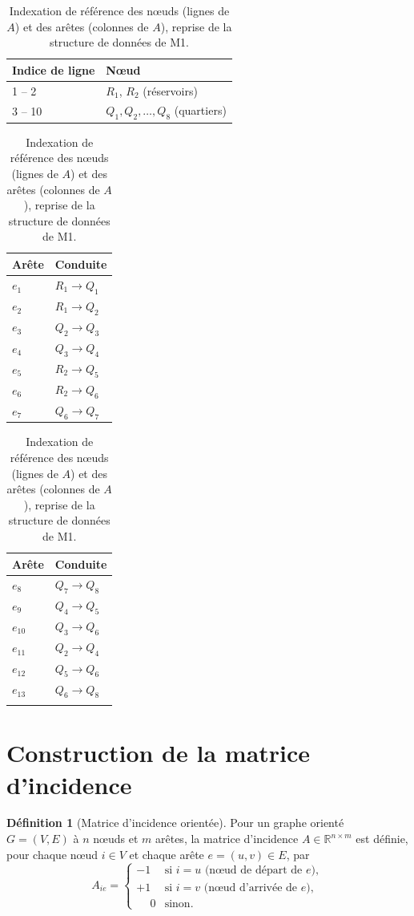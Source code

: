 \documentclass[11pt,a4paper]{article}
\theoremstyle{plain}
\theoremstyle{definition}
\newtheorem{definition}{Définition}
\theoremstyle{remark}
\begin{document}
\begin{table}[h]
\centering
\begin{tabular}{@{}ll@{}}
\toprule
Indice de ligne & Nœud \\
\midrule
1 -- 2 & $R_1$, $R_2$ (réservoirs) \\
3 -- 10 & $Q_1, Q_2, \dots, Q_8$ (quartiers) \\
\bottomrule
\end{tabular}
\qquad
\begin{tabular}{@{}ll@{}}
\toprule
Arête & Conduite \\
\midrule
$e_1$ & $R_1 \to Q_1$ \\
$e_2$ & $R_1 \to Q_2$ \\
$e_3$ & $Q_2 \to Q_3$ \\
$e_4$ & $Q_3 \to Q_4$ \\
$e_5$ & $R_2 \to Q_5$ \\
$e_6$ & $R_2 \to Q_6$ \\
$e_7$ & $Q_6 \to Q_7$ \\
\bottomrule
\end{tabular}
\qquad
\begin{tabular}{@{}ll@{}}
\toprule
Arête & Conduite \\
\midrule
$e_8$ & $Q_7 \to Q_8$ \\
$e_9$ & $Q_4 \to Q_5$ \\
$e_{10}$ & $Q_3 \to Q_6$ \\
$e_{11}$ & $Q_2 \to Q_4$ \\
$e_{12}$ & $Q_5 \to Q_6$ \\
$e_{13}$ & $Q_6 \to Q_8$ \\
& \\
\bottomrule
\end{tabular}
\caption{Indexation de référence des nœuds (lignes de $A$) et des arêtes
(colonnes de $A$), reprise de la structure de données de M1.}
\label{tab:indexation}
\end{table}

\section{Construction de la matrice d'incidence}

\begin{definition}[Matrice d'incidence orientée]
Pour un graphe orienté $G = (V, E)$ à $n$ nœuds et $m$ arêtes, la matrice
d'incidence $A \in \mathbb{R}^{n \times m}$ est définie, pour chaque nœud
$i \in V$ et chaque arête $e = (u, v) \in E$, par
\begin{equation}
A_{i e} =
\begin{cases}
-1 & \text{si } i = u \text{ (nœud de départ de } e \text{)}, \\
+1 & \text{si } i = v \text{ (nœud d'arrivée de } e \text{)}, \\
\phantom{-}0 & \text{sinon.}
\end{cases}
\label{eq:def-A}
\end{equation}
\end{definition}
\end{document}
